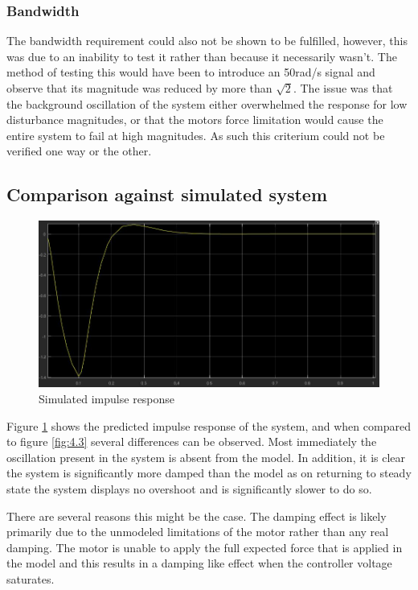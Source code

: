 \documentclass[11pt, a4paper,twocolumn]{article}
\begin{document}
	\subsubsection{Bandwidth}
The bandwidth requirement could also not be shown to be fulfilled, however, this was due to an inability to test it rather than because it necessarily wasn’t. The method of testing this would have been to introduce an 50rad/s signal and observe that its magnitude was reduced by more than $\sqrt{2}$. The issue was that the background oscillation of the system either overwhelmed the response for low disturbance magnitudes, or that the motors force limitation would cause the entire system to fail at high magnitudes. As such this criterium could not be verified one way or the other.

        \subsection{Comparison against simulated system}\label{subsec:comp}

	\begin{figure}[h!]
	\begin{center}
	\includegraphics[width=\linewidth]{ImpulseSim}
	\caption{Simulated impulse response}
	\label{fig:4.7}
	\end{center}
	\end{figure}
Figure \ref{fig:4.7} shows the predicted impulse response of the system, and when compared to figure \ref{fig:4.3} several differences can be observed. Most immediately the oscillation present in the system is absent from the model. In addition, it is clear the system is significantly more damped than the model as on returning to steady state the system displays no overshoot and is significantly slower to do so.

There are several reasons this might be the case. The damping effect is likely primarily due to the unmodeled limitations of the motor rather than any real damping. The motor is unable to apply the full expected force that is applied in the model and this results in a damping like effect when the controller voltage saturates.
\end{document}
